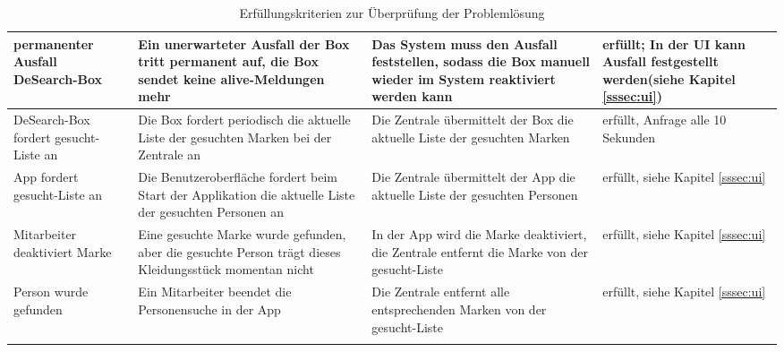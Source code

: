 \begin{center}
\begin{longtable}{ | p{} | p{5cm} | p{5cm} | p{} |}
	 \hline
	 permanenter Ausfall DeSearch-Box & Ein unerwarteter Ausfall der Box tritt permanent auf, die Box sendet keine alive-Meldungen mehr & Das System muss den Ausfall feststellen, sodass die Box manuell wieder im System reaktiviert werden kann & erfüllt; In der UI kann Ausfall festgestellt werden(siehe Kapitel \ref{sssec:ui}) \\ 
	 \hline
	 DeSearch-Box fordert gesucht-Liste an & Die Box fordert periodisch die aktuelle Liste der gesuchten Marken bei der Zentrale an & Die Zentrale übermittelt der Box die aktuelle Liste der gesuchten Marken & erfüllt, Anfrage alle 10 Sekunden \\ 
	 \hline
	 App fordert gesucht-Liste an & Die Benutzeroberfläche fordert beim Start der Applikation die aktuelle Liste der gesuchten Personen an & Die Zentrale übermittelt der App die aktuelle Liste der gesuchten Personen & erfüllt, siehe Kapitel \ref{sssec:ui}\\ 
	 \hline
	 Mitarbeiter deaktiviert Marke & Eine gesuchte Marke wurde gefunden, aber die gesuchte Person trägt dieses Kleidungsstück momentan nicht & In der App wird die Marke deaktiviert, die Zentrale entfernt die Marke von der gesucht-Liste & erfüllt, siehe Kapitel \ref{sssec:ui} \\ 
	 \hline
	 Person wurde gefunden & Ein Mitarbeiter beendet die Personensuche in der App & Die Zentrale entfernt alle entsprechenden Marken von der gesucht-Liste & erfüllt, siehe Kapitel \ref{sssec:ui}\\ 
	 \hline
	 
	 \caption{Erfüllungskriterien zur Überprüfung der Problemlösung}
	
	\label{tab:kriterien}
	\end{longtable}
	
\end{center}

